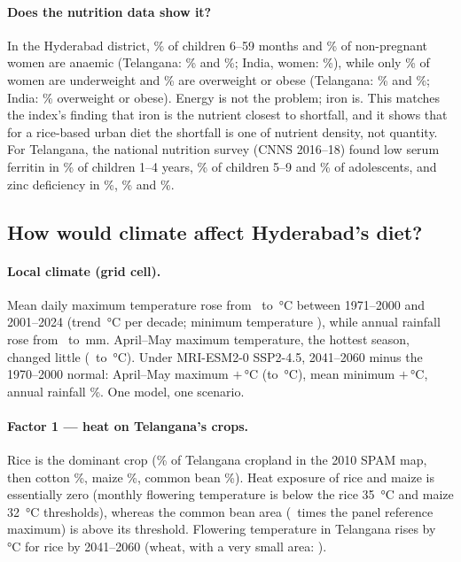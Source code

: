 \paragraph{Does the nutrition data show it?} In the Hyderabad district, \hydAnaemChild\% of children 6--59 months
and \hydAnaemNPW\% of non-pregnant women are anaemic (Telangana: \tgAnaemChild\% and \tgAnaemNPW\%; India,
women: \inAnaemNPW\%), while only \hydBmiLow\% of women are underweight and \hydOverweight\% are overweight or obese
(Telangana: \tgBmiLow\% and \tgOverweight\%; India: \inOverweight\% overweight or obese). Energy is not the
problem; iron is. This matches the index's finding that iron is the nutrient closest to shortfall, and it shows
that for a rice-based urban diet the shortfall is one of nutrient density, not quantity. For Telangana,
the national nutrition survey (CNNS 2016--18) found low serum ferritin in \cnnsIronCFour\% of children 1--4 years,
\cnnsIronCNine\% of children 5--9 and \cnnsIronAdol\% of adolescents, and zinc deficiency in \cnnsZincCFour\%,
\cnnsZincCNine\% and \cnnsZincAdol\%.

\subsection{How would climate affect Hyderabad's diet?}
\paragraph{Local climate (grid cell).} Mean daily maximum temperature rose from \hydTmaxBase\ to
\hydTmaxRecent\,\si{\celsius} between 1971--2000 and 2001--2024 (trend \hydTmaxTrend\,\si{\celsius} per decade;
minimum temperature \hydTminTrend), while annual rainfall rose from \hydRainBase\ to \hydRainRecent\,mm. April--May
maximum temperature, the hottest season, changed little (\hydAMBase\ to \hydAMRecent\,\si{\celsius}). Under
MRI-ESM2-0 SSP2-4.5, 2041--2060 minus the 1970--2000 normal: April--May maximum $+$\hydAMFutChange\,\si{\celsius}
(to \hydAMFutLevel\,\si{\celsius}), mean minimum $+$\hydTminFutChange\,\si{\celsius}, annual rainfall \hydRainFutRatio\%.
One model, one scenario.

\paragraph{Factor 1 --- heat on Telangana's crops.} Rice is the dominant crop (\tgAreaRice\% of Telangana
cropland in the 2010 SPAM map, then cotton \tgAreaCotton\%, maize \tgAreaMaize\%, common bean \tgAreaBean\%).
Heat exposure of rice and maize is essentially zero (monthly flowering temperature is below the rice
\SI{35}{\celsius} and maize \SI{32}{\celsius} thresholds), whereas the common bean area (\tgBeanEheatTwoZeroZeroOneTwoZeroTwoFour\ times the panel reference maximum)
is above its threshold. Flowering temperature in Telangana rises by \tgRicedTefffutureC\,\si{\celsius} for
rice by 2041--2060 (wheat, with a very small area: \tgWheatdTefffutureC).

